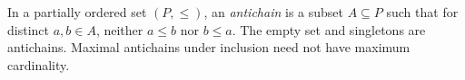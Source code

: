 
In a partially ordered set $(P,\le)$, an \emph{antichain} is a subset $A\subseteq P$ such that for distinct $a,b\in A$, neither $a\le b$ nor $b\le a$. The empty set and singletons are antichains. Maximal antichains under inclusion need not have maximum cardinality.

